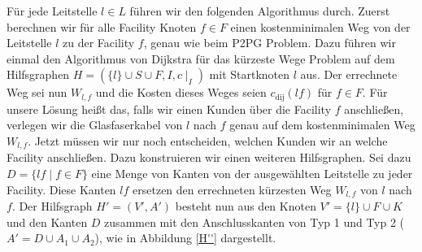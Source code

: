 \documentclass[11pt,a4paper]{article}
\theoremstyle{my_th_style1}
\begin{document}
Für jede Leitstelle $l \in L$ führen wir den folgenden Algorithmus durch.
Zuerst berechnen wir für alle Facility Knoten $f \in F$ einen kostenminimalen Weg von der Leitstelle $l$ zu der Facility $f$, genau wie beim P2PG Problem. Dazu führen wir einmal den Algorithmus von Dijkstra für das kürzeste Wege Problem auf dem Hilfsgraphen $H=(\{l\} \cup S \cup F , I,c\mid_I)$ mit Startknoten $l$ aus. Der errechnete Weg sei nun $W_{l,f}$ und die Kosten dieses Weges seien $c_{\text{dij}}(lf)$ f\"ur \(f \in F\).
Für unsere Lösung heißt das, falls wir einen Kunden über die Facility $f$ anschließen, verlegen wir die Glasfaserkabel von $l$ nach $f$ genau auf dem kostenminimalen Weg $W_{l,f}$.
Jetzt müssen wir nur noch entscheiden, welchen Kunden wir an welche Facility anschließen.
Dazu konstruieren wir einen weiteren Hilfsgraphen. Sei dazu $D=\{lf \mid f \in F  \}$ eine Menge von Kanten von der ausgewählten Leitstelle zu jeder Facility.
Diese Kanten $lf$ ersetzen den errechneten kürzesten Weg $W_{l,f}$ von $l$ nach $f$. Der Hilfsgraph $H'=(V',A')$ besteht nun aus den Knoten $V'=\{l\} \cup F \cup K$ und den Kanten $D$ zusammen mit den Anschlusskanten von Typ 1 und Typ 2 ($A'=D \cup A_1 \cup A_2$), wie in Abbildung \ref{H''} dargestellt.
\end{document}
